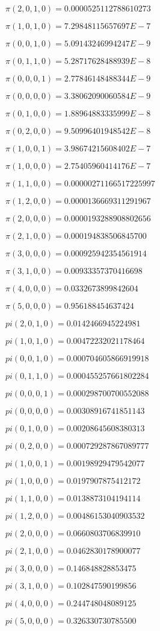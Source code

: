 \item $\pi(2,0,1,0) = 0.0000525112788610273$
\item $\pi(1,0,1,0) = 7.29848115657697E-7$
\item $\pi(0,0,1,0) = 5.09143246994247E-9$
\item $\pi(0,1,1,0) = 5.28717628488939E-8$
\item $\pi(0,0,0,1) = 2.77846148488344E-9$
\item $\pi(0,0,0,0) = 3.38062090060584E-9$
\item $\pi(0,1,0,0) = 1.88964883335999E-8$
\item $\pi(0,2,0,0) = 9.50996401948542E-8$
\item $\pi(1,0,0,1) = 3.98674215608402E-7$
\item $\pi(1,0,0,0) = 2.75405960414176E-7$
\item $\pi(1,1,0,0) = 0.00000271166517225997$
\item $\pi(1,2,0,0) = 0.0000136669311291967$
\item $\pi(2,0,0,0) = 0.0000193288908802656$
\item $\pi(2,1,0,0) = 0.000194838506845700$
\item $\pi(3,0,0,0) = 0.000925942354561914$
\item $\pi(3,1,0,0) = 0.00933357370416698$
\item $\pi(4,0,0,0) = 0.0332673899842604$
\item $\pi(5,0,0,0) = 0.956188454637424$

\item $pi(2, 0, 1, 0) = 0.0142466945224981$
\item $pi(1, 0, 1, 0) = 0.00472232021178464$
\item $pi(0, 0, 1, 0) = 0.000704605866919918$
\item $pi(0, 1, 1, 0) = 0.000455257661802284$
\item $pi(0, 0, 0, 1) = 0.000298700700552088$
\item $pi(0, 0, 0, 0) = 0.00308916741851143$
\item $pi(0, 1, 0, 0) = 0.00208645608380313$
\item $pi(0, 2, 0, 0) = 0.000729287867089777$
\item $pi(1, 0, 0, 1) = 0.00198929479542077$
\item $pi(1, 0, 0, 0) = 0.0197907875412172$
\item $pi(1, 1, 0, 0) = 0.0138873104194114$
\item $pi(1, 2, 0, 0) = 0.00486153040903532$
\item $pi(2, 0, 0, 0) = 0.0660803706839910$
\item $pi(2, 1, 0, 0) = 0.0462830178900077$
\item $pi(3, 0, 0, 0) = 0.146848828853475$
\item $pi(3, 1, 0, 0) = 0.102847590199856$
\item $pi(4, 0, 0, 0) = 0.244748048089125$
\item $pi(5, 0, 0, 0) = 0.326330730785500$